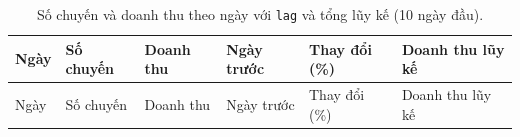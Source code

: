\documentclass[
  12pt,
  a4paper,
]{report}
\begin{document}
\begin{longtable}[]{@{}
  >{\raggedright\arraybackslash}p{}
  >{\raggedleft\arraybackslash}p{}
  >{\raggedleft\arraybackslash}p{}
  >{\raggedleft\arraybackslash}p{}
  >{\raggedleft\arraybackslash}p{}
  >{\raggedleft\arraybackslash}p{}@{}}
\caption{\label{tbl:l05-daily}Số chuyến và doanh thu theo ngày với
\texttt{lag} và tổng lũy kế (10 ngày đầu).}\tabularnewline
\toprule\noalign{}
\begin{minipage}[b]{\linewidth}\raggedright
Ngày
\end{minipage} & \begin{minipage}[b]{\linewidth}\raggedleft
Số chuyến
\end{minipage} & \begin{minipage}[b]{\linewidth}\raggedleft
Doanh thu
\end{minipage} & \begin{minipage}[b]{\linewidth}\raggedleft
Ngày trước
\end{minipage} & \begin{minipage}[b]{\linewidth}\raggedleft
Thay đổi (\%)
\end{minipage} & \begin{minipage}[b]{\linewidth}\raggedleft
Doanh thu lũy kế
\end{minipage} \\
\midrule\noalign{}
\endfirsthead
\toprule\noalign{}
\begin{minipage}[b]{\linewidth}\raggedright
Ngày
\end{minipage} & \begin{minipage}[b]{\linewidth}\raggedleft
Số chuyến
\end{minipage} & \begin{minipage}[b]{\linewidth}\raggedleft
Doanh thu
\end{minipage} & \begin{minipage}[b]{\linewidth}\raggedleft
Ngày trước
\end{minipage} & \begin{minipage}[b]{\linewidth}\raggedleft
Thay đổi (\%)
\end{minipage} & \begin{minipage}[b]{\linewidth}\raggedleft
Doanh thu lũy kế
\end{minipage} \\

\end{longtable}
\end{document}
